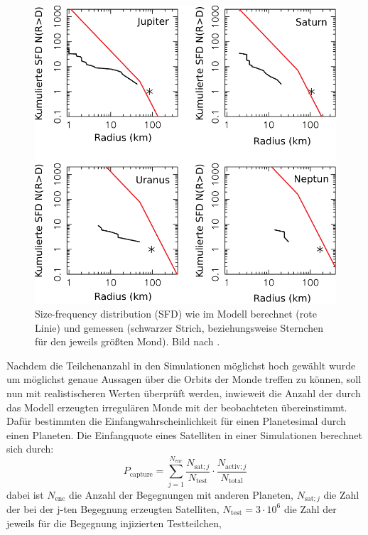 \documentclass[12pt,a4paper,twoside]{article}
\renewcommand{\cite}{\citep}
\begin{document}
\begin{figure}[tbn]
\centering
\includegraphics[scale=.5]{img/Nesvorny2007-9}
\caption{Size-frequency distribution (SFD) wie im Modell berechnet (rote Linie) und gemessen (schwarzer Strich, beziehungsweise Sternchen für den jeweils größten Mond). Bild nach \cite{Nesvorny2007}.}
\label{fig:SFD}
\end{figure}
Nachdem die Teilchenanzahl in den Simulationen möglichst hoch gewählt wurde um möglichst genaue Aussagen über die Orbits der Monde treffen zu können, 
soll nun mit realistischeren Werten überprüft werden, inwieweit die Anzahl der durch das Modell erzeugten irregulären Monde mit der beobachteten übereinstimmt.
Dafür bestimmten \cite{Nesvorny2007} die Einfangwahrscheinlichkeit für einen Planetesimal durch einen Planeten.
Die Einfangquote eines Satelliten in einer Simulationen berechnet sich durch:
\begin{equation}
P_{\mathrm{capture}} = \sum\limits^{N_{\mathrm{enc}}}_{j=1} \frac{N_{\mathrm{sat}; j}}{N_{\mathrm{test}}}\cdot \frac{N_{\mathrm{activ}; j}}{N_{\mathrm{total}}}
\end{equation} %
dabei ist $N_{\mathrm{enc}}$ die Anzahl der Begegnungen mit anderen Planeten, $N_{\mathrm{sat};j}$ die Zahl der bei der j-ten Begegnung erzeugten Satelliten, $N_{\mathrm{test}} = 3 \cdot 10^6$ die Zahl der jeweils für die Begegnung injizierten Testteilchen, 
\end{document}
